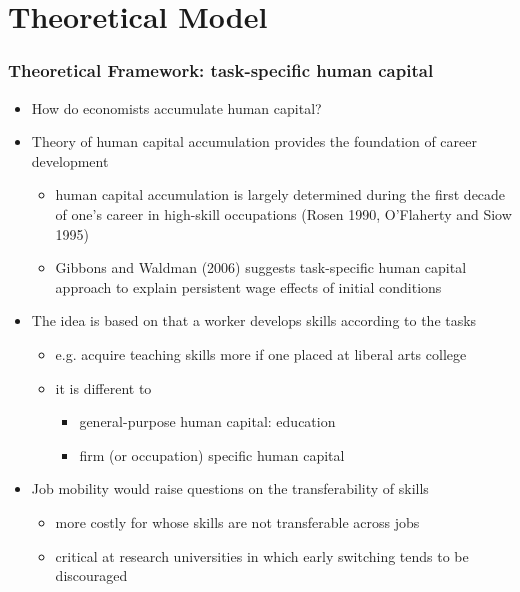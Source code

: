 \documentclass[10pt,svgnames,fragile]{beamer}
\begin{document}
\section{Theoretical Model}
\begin{frame}
	\frametitle{Theoretical Framework: task-specific human capital}
	\begin{itemize}
		\item How do economists accumulate human capital?
\vfill
		\item Theory of human capital accumulation provides the foundation of career development
		\begin{itemize}
			\item human capital accumulation is largely determined during the first decade of one's career in high-skill occupations {\small (Rosen 1990, O'Flaherty and Siow 1995)} 
				\vspace{1 mm}
			\item Gibbons and Waldman (2006) suggests task-specific human capital approach to explain persistent wage effects of initial conditions 
		\end{itemize}
\vfill
		\item The idea is based on that a worker develops skills according to the tasks
		\begin{itemize}
			\item e.g. acquire teaching skills more if one placed at liberal arts college
				\vspace{1 mm}
			\item it is different to
			\begin{itemize}
				\item general-purpose human capital: education
					\vspace{1 mm}
				\item firm (or occupation) specific human capital
			\end{itemize}
		\end{itemize}
\vfill
		\item Job mobility would raise  questions on the transferability of skills 
		\begin{itemize}
			\vspace{1 mm}
			\item more costly for  whose skills are not transferable across jobs
			\vspace{1 mm}
			\item critical at research universities in which early switching tends to be discouraged 						
		\end{itemize}
\vfill
	\end{itemize}
\end{frame}
\end{document}
